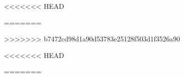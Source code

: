 \documentclass[10pt]{article}
\begin{document}

<<<<<<< HEAD


=======


>>>>>>> b7472cd98d1a90d53783e25128f503d1f3526a90



<<<<<<< HEAD

=======
\end{document}
